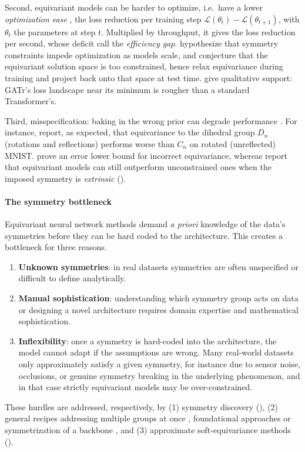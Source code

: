 \documentclass[mathematics,review,submit,moreauthors]{Definitions/mdpi}
\begin{document}
Second, equivariant models can be harder to optimize, i.e.\ have a lower \emph{optimization ease} \citep{shen2026}, the loss reduction per training step $\mathcal{L}(\theta_t)-\mathcal{L}(\theta_{t+1})$, with $\theta_t$ the parameters at step $t$.
Multiplied by throughput, it gives the loss reduction per second, whose deficit \citet{shen2026} call the \emph{efficiency gap}.
\citet{qu2024anips} hypothesize that symmetry constraints impede optimization as models scale, and \citet{pertigkiozoglou2024} conjecture that the equivariant solution space is too constrained, hence relax equivariance during training and project back onto that space at test time.
\citet[app.~A]{elhag2026} give qualitative support: GATr's loss landscape near its minimum is rougher than a standard Transformer's.

Third, misspecification: baking in the wrong prior can degrade performance \citep{yang2023p4icml,finzi2021anips,benton2020anips,miao2023p4icml}.
For instance, \citet{weiler2019anips} report, as expected, that equivariance to the dihedral group $D_n$ (rotations and reflections) performs worse than $C_n$ on rotated (unreflected) MNIST.
\citet{wang2023a} prove an error lower bound for incorrect equivariance, whereas \citet{wang2022b} report that equivariant models can still outperform unconstrained ones when the imposed symmetry is \emph{extrinsic} ().

\paragraph{The symmetry bottleneck}\label{par:sym-bottleneck}
Equivariant neural network methods demand \textit{a priori} knowledge of the data's symmetries before they can be hard coded to the architecture.
This creates a bottleneck for three reasons.
\begin{enumerate}
    \item \textbf{Unknown symmetries}: in real datasets symmetries are often unspecified or difficult to define analytically.
    \item \textbf{Manual sophistication}: understanding which symmetry group acts on data or designing a novel architecture requires domain expertise and mathematical sophistication.
    \item \textbf{Inflexibility}: once a symmetry is hard-coded into the architecture, the model cannot adapt if the assumptions are wrong.
    Many real-world datasets only approximately satisfy a given symmetry, for instance due to sensor noise, occlusions, or genuine symmetry breaking in the underlying phenomenon, and in that case strictly equivariant models may be over-constrained.
\end{enumerate}
These hurdles are addressed, respectively, by (1) symmetry discovery (), (2) general recipes addressing multiple groups at once \citep{ravanbakhsh2017p3icml,finzi2020p3icml,finzi2021p3icml,pearce-crump2023p4icml}, foundational approaches \citep{goel2025} or symmetrization of a backbone \citep{puny2021,kaba2023p4icml}, and (3) approximate soft-equivariance methods ().
\end{document}
